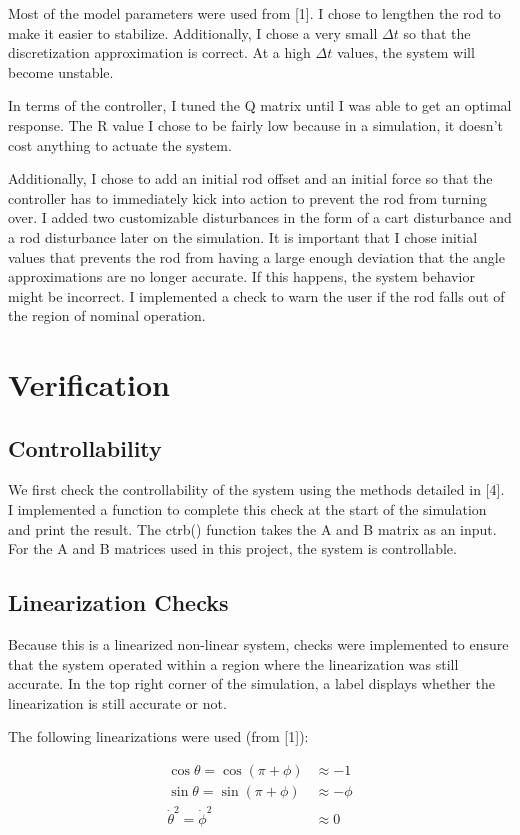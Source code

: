 \documentclass{article}
\begin{document}
Most of the model parameters were used from [1]. I chose to lengthen the rod to make it easier to stabilize. Additionally, I chose a very small $\Delta t$ so that the discretization approximation is correct. At a high $\Delta t$ values, the system will become unstable. 

In terms of the controller, I tuned the Q matrix until I was able to get an optimal response. The R value I chose to be fairly low because in a simulation, it doesn't cost anything to actuate the system.

Additionally, I chose to add an initial rod offset and an initial force so that the controller has to immediately kick into action to prevent the rod from turning over. I added two customizable disturbances in the form of a cart disturbance and a rod disturbance later on the simulation. It is important that I chose initial values that prevents the rod from having a large enough deviation that the angle approximations are no longer accurate. If this happens, the system behavior might be incorrect. I implemented a check to warn the user if the rod falls out of the region of nominal operation.


\section{Verification}

\subsection{Controllability}
We first check the controllability of the system using the methods detailed in [4]. I implemented a function to complete this check at the start of the simulation and print the result. The ctrb() function takes the A and B matrix as an input. For the A and B matrices used in this project, the system is controllable.

\subsection{Linearization Checks}
Because this is a linearized non-linear system, checks were implemented to ensure that the system operated within a region where the linearization was still accurate. In the top right corner of the simulation, a label displays whether the linearization is still accurate or not.

The following linearizations were used (from [1]):

\begin{align}
    \cos{\theta} = \cos{(\pi + \phi)} &\approx -1 \\
    \sin{\theta} = \sin{(\pi + \phi)} &\approx -\phi \\
    \Dot{\theta}^2 = \Dot{\phi}^2 &\approx 0 \\
\end{align}
\end{document}
